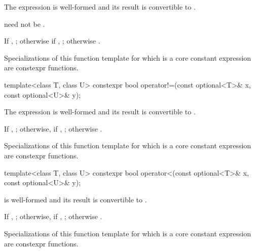 \begin{itemdescr}
\pnum
\constraints
The expression  is well-formed and its result is convertible to .
\begin{note}
 need not be .
\end{note}

\pnum
\returns
If , ; otherwise if , ; otherwise .

\pnum
\remarks
Specializations of this function template for which  is a core constant expression are constexpr functions.
\end{itemdescr}

%
\begin{itemdecl}
template<class T, class U>
  constexpr bool operator!=(const optional<T>& x, const optional<U>& y);
\end{itemdecl}

\begin{itemdescr}
\pnum
\constraints
The expression  is well-formed and its result is convertible to .

\pnum
\returns
If , ; otherwise, if , ; otherwise .

\pnum
\remarks
Specializations of this function template for which  is a core constant expression are constexpr functions.
\end{itemdescr}

%
\begin{itemdecl}
template<class T, class U>
  constexpr bool operator<(const optional<T>& x, const optional<U>& y);
\end{itemdecl}

\begin{itemdescr}
\pnum
\constraints
{} is well-formed and its result is convertible to .

\pnum
\returns
If , ; otherwise, if , ; otherwise .

\pnum
\remarks
Specializations of this function template for which  is a core constant expression are constexpr functions.
\end{itemdescr}


